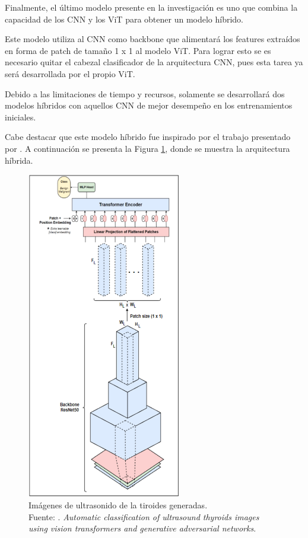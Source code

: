 Finalmente, el último modelo presente en la investigación es uno que combina la capacidad de los CNN y los ViT para obtener un modelo híbrido.

Este modelo utiliza al CNN como backbone que alimentará los features extraídos en forma de patch de tamaño 1 x 1 al modelo ViT. Para lograr esto se es necesario quitar el cabezal clasificador de la arquitectura CNN, pues esta tarea ya será desarrollada por el propio ViT.

Debido a las limitaciones de tiempo y recursos, solamente se desarrollará dos modelos híbridos con aquellos CNN de mejor desempeño en los entrenamientos iniciales.

Cabe destacar que este modelo híbrido fue inspirado por el trabajo presentado por \cite{pr_JERBI2023autoclassViTGAN}. A continuación se presenta la Figura \ref{4:fig101}, donde se muestra la arquitectura híbrida.

\begin{figure}[H]
	\begin{center}
		\includegraphics[width=0.60\textwidth]{4/figures/hybrid_arc.png}
		\caption[Imágenes de ultrasonido de la tiroides generadas]{Imágenes de ultrasonido de la tiroides generadas. \\
		Fuente: \cite{pr_JERBI2023autoclassViTGAN}. \textit{Automatic classification of ultrasound thyroids images using vision transformers and generative adversarial networks}.}
		\label{4:fig101}
	\end{center}
\end{figure}

